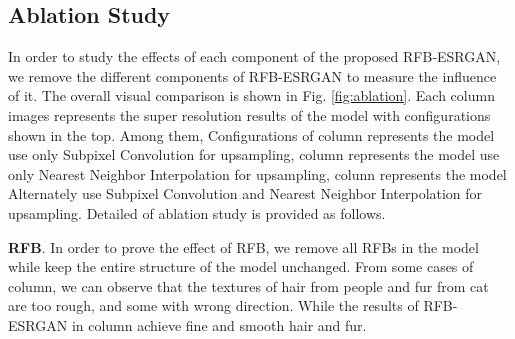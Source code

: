 \documentclass[10pt,twocolumn,letterpaper]{article}
\begin{document}
\begin{table}[htbp]
\centering
{}
\caption{Results of NTIRE 2020 perceptual extreme SR challenge. The PSNR, SSIM, LPIPS and PI are calculated on the center 1,000x1,000 subimages of the DIV8K test images \cite{zhang2020ntire}.}
\label{tab:challenge}
\end{table}


\subsection{Ablation Study}
In order to study the effects of each component of the proposed RFB-ESRGAN, we remove the different components of RFB-ESRGAN to measure the influence of it. The overall visual comparison is shown in Fig. \ref{fig:ablation}. Each column images represents the super resolution results of the model with configurations shown in the top. Among them, Configurations of  column represents the model use only Subpixel Convolution for upsampling,  column represents the model use only Nearest Neighbor Interpolation for upsampling,  colunn represents the model Alternately use Subpixel Convolution and Nearest Neighbor Interpolation for upsampling. Detailed of ablation study is provided as follows.

\textbf{RFB}. In order to prove the effect of RFB, we remove all RFBs in the model while keep the entire structure of the model unchanged. From some cases of  column, we can observe that the textures of hair from people and fur from cat are too rough, and some with wrong direction. While the results of RFB-ESRGAN in  column achieve fine and smooth hair and fur. 
\end{document}
